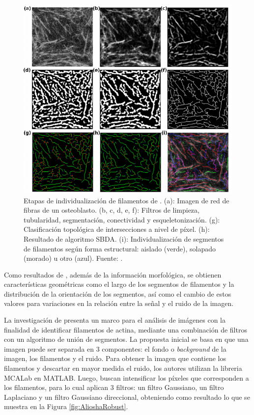 \begin{figure}[h!]
        \includegraphics[scale=0.75]{imagenes/QuantitativeIFS.png}
        \caption[Etapas de individualizaci\'on de filamentos de \cite{qiu2014quantitative}.]{Etapas de individualizaci\'on de filamentos de \cite{qiu2014quantitative}. (a): Imagen de red de fibras de un osteoblasto. (b, c, d, e, f): Filtros de limpieza, tubularidad, segmentaci\'on, conectividad y esqueletonizaci\'on. (g): Clasificaci\'on topol\'ogica de intersecciones a nivel de p\'ixel. (h): Resultado de algoritmo SBDA. (i): Individualizaci\'on de segmentos de filamentos seg\'un forma estructural: aislado (verde), solapado (morado) u otro (azul). Fuente: \cite{qiu2014quantitative}.}
        \label{fig:IFS}
\end{figure}

Como resultados de \cite{qiu2014quantitative}, adem\'as de la informaci\'on morfol\'ogica, se obtienen caracter\'isticas geom\'etricas como el largo de los segmentos de  filamentos y la distribuci\'on de la orientaci\'on de los segmentos, as\'i como el cambio de estos valores para variaciones en la relaci\'on entre la se\~nal y el ruido de la imagen.


\smallskip
La investigaci\'on de \citet{alioscha2016robust} presenta un marco para el an\'alisis de im\'agenes con la finalidad de identificar filamentos de actina, mediante una combinaci\'on de filtros con un algoritmo de uni\'on de segmentos. La propuesta inicial se basa en que una imagen puede ser separada en 3 componentes: el fondo o {\it background} de la imagen, los filamentos y el ruido. Para obtener la imagen que contiene los filamentos y descartar en mayor medida el ruido, los autores utilizan la libreria MCALab en MATLAB. Luego, buscan intensificar los p\'ixeles que corresponden a los filamentos, para lo cual aplican 3 filtros: un filtro Gaussiano, un filtro Laplaciano y un filtro Gaussiano direccional, obteniendo como resultado lo que se muestra en la Figura \ref{fig:AlioshaRobust}.


